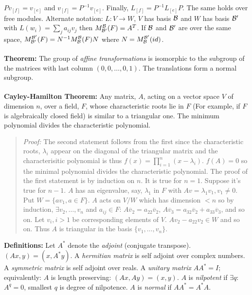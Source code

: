 $Pv_{[f]}= v_{[e]}$ and
$v_{[f]}= P^{-1}v_{[e]}$.  Finally, $L_{[f]}= P^{-1} L_{[e]}P$.  The same holds over free
modules.  Alternate notation: $L: V \rightarrow W$, 
$V$ has basis ${\cal B}$ and
$W$ has basis ${\cal B'}$ with $L(w_i)= \sum_j a_{ij} v_j$ then
$M^{\cal B}_{\cal B'}(F)= A^T$.  If ${\cal B}$ and ${\cal B'}$ are over
the same space, 
$M^{\cal B'}_{\cal B'}(F)= N^{-1}M^{\cal B}_{\cal B}(F)N$ where
$N= M^{\cal B'}_{\cal B}(id)$.
\\
\\
{\bf Theorem:}
The group of \emph{affine transformations} is isomorphic
to the subgroup of the matrices with last column $(0,0, \ldots, 0,1)$.
The translations form a normal subgroup.
\\
\\
{\bf Cayley-Hamilton Theorem:}  
Any matrix, $A$,
acting on a vector space $V$ of dimension $n$, over a field, $F$, whose 
characteristic roots lie in $F$ (For example, if $F$ is
algebraically closed field) is similar to a 
triangular one.  The minimum polynomial divides the characteristic polynomial.
\begin{quote}
\emph{Proof:}
The second statement follows from the first since the characteristic roots, $\lambda_i$
appear on the diagonal of the triangular matrix and the characterisitic polynomial is
thus $f(x)= \prod_{i=1}^n (x-\lambda_i)$.  $f(A)=0$ so the minimal polynomial divides the
characteristic polynomial.  The proof of the first statement is by induction on $n$.  It is
true for $n=1$.  Suppose it's true for $n-1$.  $A$ has an eigenvalue, say, $\lambda_1$ in
$F$ with $Av= \lambda_1 v_1, v_1 \ne 0$.  Put $W= \{ av_1, a \in F \}$. $A$ acts on
$V/W$ which has dimension $<n$ so by induction, $\exists v_2 , \ldots , v_n$ and
$a_{ij} \in F$: 
$A {\overline v}_2= a_{22} {\overline v}_2$,
$A {\overline v}_3= 
a_{32} {\overline v}_2 +
a_{33} {\overline v}_3$,
and so on.  Let $v_i, i>1$ be corresponding elements of $V$.  $Av_2-a_{22}v_2 \in W$ and
so on.  Thus $A$ is triangular in the basis $\{ v_1, \ldots, v_n \}$.
\end{quote}
{\bf Definitions:} Let $A^*$ denote the \emph{adjoint} (conjugate transpose).  
$(Ax,y)=(x,A^*y)$.
A \emph{hermitian matrix} is self adjoint over complex numbers.
A \emph{symmetric matrix} is self adjoint over reals.  
A \emph{unitary matrix} $AA^*=I$; equivalently: $A$ is length
preserving: $(Ax,Ay)=(x,y)$.  
$A$ is \emph{nilpotent} if $\exists q$: $A^q = 0$, smallest $q$ is degree of nilpotence.
$A$ is \emph{normal} if $A A^*= A^* A$.
\\
